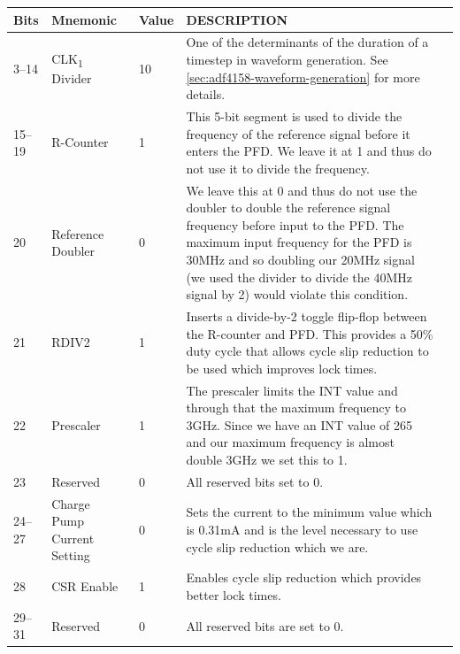 \label{tab:adf4158-reg-map-2}
\begin{tabularx}{\textwidth}{l l l X>{\raggedright\arraybackslash}X}
        \caption{R-DIVIDER REGISTER(R2) MAP} \\
        \toprule
        \textbf{Bits} & \textbf{Mnemonic} & \textbf{Value} & \textbf{DESCRIPTION} \\
        \midrule

        \endhead

        3--14 & CLK\textsubscript{1} Divider & 10 & One of the determinants of the duration of a timestep in
        waveform generation. See
        \cref{sec:adf4158-waveform-generation} for more
        details. \\
        15--19 & R-Counter & 1 & This 5-bit segment is used to divide the frequency of the reference signal
        before it enters the PFD. We leave it at 1 and thus do not use it to
        divide the frequency. \\
        20 & Reference Doubler & 0 & We leave this at 0 and thus do not use the doubler to double the
        reference signal frequency before input to the PFD. The maximum input
        frequency for the PFD is 30MHz and so doubling our 20MHz signal (we
        used the divider to divide the 40MHz signal by 2) would violate this
        condition. \\
        21 & RDIV2 & 1 & Inserts a divide-by-2 toggle flip-flop between the R-counter and PFD. This
        provides a 50\% duty cycle that allows cycle slip reduction to be used which
        improves lock times. \\
        22 & Prescaler & 1 & The prescaler limits the INT value and through that the maximum frequency to
        3GHz. Since we have an INT value of 265 and our maximum frequency is almost
        double 3GHz we set this to 1. \\
        23 & Reserved & 0 & All reserved bits set to 0. \\
        24--27 & Charge Pump Current Setting & 0 & Sets the current to the minimum value which is 0.31mA
        and is the level necessary to use cycle slip reduction
        which we are. \\
        28 & CSR Enable & 1 & Enables cycle slip reduction which provides better lock times. \\
        29--31 & Reserved & 0 & All reserved bits are set to 0. \\

        \bottomrule
\end{tabularx}

